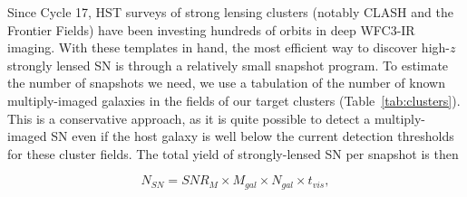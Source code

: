 




\medskip
{}

Since Cycle 17, HST surveys of strong lensing clusters (notably CLASH
and the Frontier Fields) have been investing hundreds of orbits in deep
WFC3-IR imaging.  With these templates in hand, the most efficient
way to discover high-$z$ strongly lensed SN is through a relatively
small snapshot program.    To estimate the number of snapshots we
need, we use a tabulation of the number of known multiply-imaged
galaxies in the fields of our target clusters
(Table~\ref{tab:clusters}).  This is a conservative approach, as it is
quite possible to detect a multiply-imaged SN even if the host galaxy
is well below the current detection thresholds for these cluster
fields. The total yield of strongly-lensed SN per snapshot is then

\begin{equation} \label{eq:Nsn}
N_{SN} = SNR_{M} \times M_{gal} \times N_{gal} \times t_{vis},
\end{equation}

